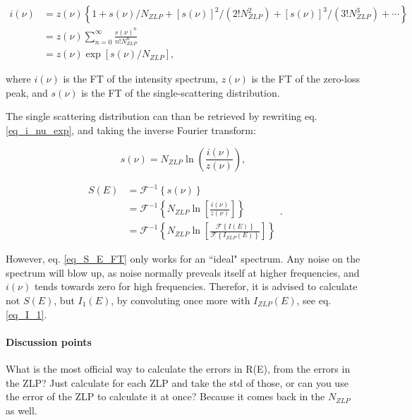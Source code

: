 \begin{equation}\label{eq_i_nu_exp}
    \begin{aligned}
i(\nu) &=z(\nu)\left\{1+s(\nu) / N_{ZLP}+[s(\nu)]^{2} /\left(2 ! N_{ZLP}^{2}\right)+[s(\nu)]^{3} /\left(3 ! N_{ZLP}^{3}\right)+\cdots\right\} \\
&=z(\nu)\sum_{n=0}^\infty\frac{s(\nu)^n}{n! N_{ZLP}^n}\\
&=z(\nu) \exp \left[s(\nu) / N_{ZLP}\right],
\end{aligned}
\end{equation}

where $i(\nu)$ is the FT of the intensity spectrum, $z(\nu)$ is the FT of the zero-loss peak, and $s(\nu)$ is the FT of the single-scattering distribution.


The single scattering distribution can than be retrieved by rewriting eq. \eqref{eq_i_nu_exp}, and taking the inverse Fourier transform:

\begin{equation}
    s(\nu) = N_{ZLP} \operatorname{ln}\left(\frac{i(\nu)}{z(\nu)}\right),
\end{equation}

\begin{equation}\label{eq_S_E_FT}
    \begin{aligned}
    S(E) &= \mathcal{F}^{-1}\left\{s(\nu)\right\} \\
    &= \mathcal{F}^{-1}\left\{N_{ZLP}\operatorname{ln}\left[\frac{i(\nu)}{z(\nu)}\right]\right\} \\
    &= \mathcal{F}^{-1}\left\{N_{ZLP}\operatorname{ln}\left[\frac{\mathcal{F}\left\{I(E)\right\}}{\mathcal{F}\left\{I_{ZLP}(E)\right\}}\right]\right\}
    \end{aligned}.
\end{equation}


However, eq. \eqref{eq_S_E_FT} only works for an ``ideal" spectrum. Any noise on the spectrum will blow up, as noise normally preveals itself at higher frequencies, and $i(\nu)$ tends towards zero for high frequencies. Therefor, it is advised to calculate not $S(E)$, but $I_1(E)$, by convoluting once more with $I_{ZLP}(E)$, see eq. \eqref{eq_I_1}. \cite{egerton_book}




\paragraph{Discussion points} What is the most official way to calculate the errors in R(E), from the errors in the ZLP? Just calculate for each ZLP and take the std of those, or can you use the error of the ZLP to calculate it at once? Because it comes back in the $N_{ZLP}$ as well.




